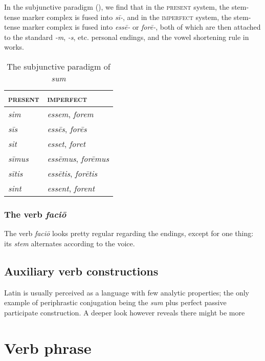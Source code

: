 \documentclass[a4paper, oneside, 12pt]{report}
\newcommand{\form}[1]{\emph{#1}}
\newcommand*{\category}[1]{\textsc{#1}}
\begin{document}
In the subjunctive paradigm (),
we find that in the \category{present} system, 
the stem-tense marker complex is fused into \form{sī-},
and in the \category{imperfect} system,
the stem-tense marker complex is fused into \form{ess\={e}-} or \form{for\={e}-},
both of which are then attached to the standard \form{-m}, \form{-s}, etc. 
personal endings, 
and the vowel shortening rule in  works.

\begin{table}[H]
    \caption{The subjunctive paradigm of \form{sum}}
    \centering
    \label{tbl:subjunctive-sum}
    \begin{tabular}{ll}
    \toprule
    \category{present}   & \category{imperfect}   \\ \midrule
    \form{sim}       & \form{essem}, \form{forem}       \\
    \form{sīs}   & \form{ess\={e}s}, \form{for\={e}s}   \\
    \form{sit}       & \form{esset}, \form{foret}       \\
    \form{sīmus} & \form{ess\={e}mus}, \form{for\={e}mus} \\
    \form{sītis} & \form{ess\={e}tis}, \form{for\={e}tis} \\
    \form{sint}      & \form{essent}, \form{forent}     \\ \bottomrule
    \end{tabular}
\end{table}

\subsection{The verb \form{faci\={o}}}

The verb \form{faci\={o}} looks pretty regular
regarding the endings, 
except for one thing: 
its \emph{stem} alternates according to the voice.

\section{Auxiliary verb constructions}

Latin is usually perceived as a language with few analytic properties;
the only example of periphrastic conjugation 
being the \form{sum} plus perfect passive participate construction.
A deeper look however reveals 
there might be more 

\chapter{Verb phrase}
\end{document}
